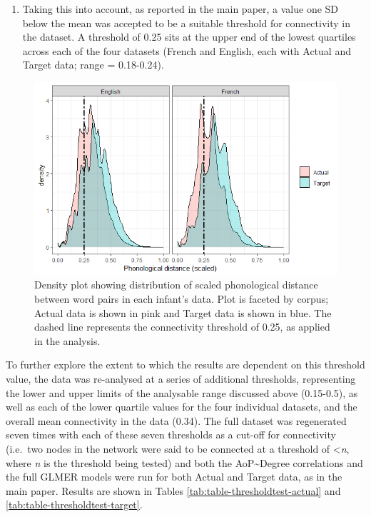 \documentclass[
  man,floatsintext]{apa6}
\providecommand{\tightlist}{%
  \setlength{\itemsep}{0pt}\setlength{\parskip}{0pt}}
\begin{document}
\begin{enumerate}
\def\labelenumi{\arabic{enumi})}
\setcounter{enumi}{1}
\tightlist
\item
  Taking this into account, as reported in the main paper, a value one SD below the mean was accepted to be a suitable threshold for connectivity in the dataset. A threshold of 0.25 sits at the upper end of the lowest quartiles across each of the four datasets (French and English, each with Actual and Target data; range = 0.18-0.24).
\end{enumerate}

\begin{figure}
\centering
\includegraphics{Images/distance-density-plot.png}
\caption{\label{fig:dist-density-plot}Density plot showing distribution of scaled phonological distance between word pairs in each infant's data. Plot is faceted by corpus; Actual data is shown in pink and Target data is shown in blue. The dashed line represents the connectivity threshold of 0.25, as applied in the analysis.}
\end{figure}

To further explore the extent to which the results are dependent on this threshold value, the data was re-analysed at a series of additional thresholds, representing the lower and upper limits of the analysable range discussed above (0.15-0.5), as well as each of the lower quartile values for the four individual datasets, and the overall mean connectivity in the data (0.34). The full dataset was regenerated seven times with each of these seven thresholds as a cut-off for connectivity (i.e.~two nodes in the network were said to be connected at a threshold of \textless{}\emph{n}, where \emph{n} is the threshold being tested) and both the AoP\textasciitilde Degree correlations and the full GLMER models were run for both Actual and Target data, as in the main paper. Results are shown in Tables \ref{tab:table-thresholdtest-actual} and \ref{tab:table-thresholdtest-target}.
\end{document}
